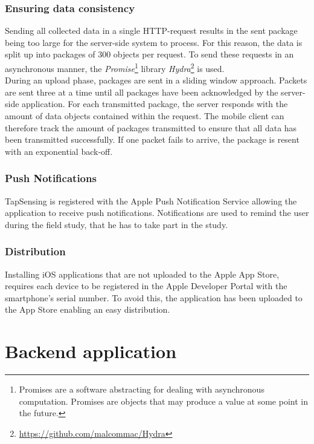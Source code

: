\subsubsection{Ensuring data consistency}
Sending all collected data in a single HTTP-request results in the sent package being too large for the server-side system to process. For this reason, the data is split up into packages of 300 objects per request. To send these requests in an asynchronous manner, the \textit{Promise}\footnote{Promises are a software abstracting for dealing with asynchronous computation. Promises are objects that may produce a value at some point in the future.}\cite{Liskov:1988:PLS:53990.54016} library \textit{Hydra}\footnote{\url{https://github.com/malcommac/Hydra}} is used. \\

During an upload phase, packages are sent in a sliding window approach. Packets are sent three at a time until all packages have been acknowledged by the server-side application. For each transmitted package, the server responds with the amount of data objects contained within the request. The mobile client can therefore track the amount of packages transmitted to ensure that all data has been transmitted successfully.
If one packet fails to arrive, the package is resent with an exponential back-off.
\subsubsection{Push Notifications}
TapSensing is registered with the Apple Push Notification Service allowing the application to receive push notifications. Notifications are used to remind the user during the field study, that he has to take part in the study.
\subsubsection{Distribution}
Installing iOS applications that are not uploaded to the Apple App Store, requires each device to be registered in the Apple Developer Portal with the smartphone's serial number. To avoid this, the application has been uploaded to the App Store enabling an easy distribution.

\section{Backend application}
\label{sec:backend}
